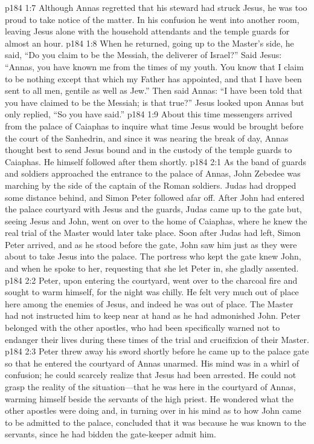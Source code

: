 \vs p184 1:7 Although Annas regretted that his steward had struck Jesus, he was too proud to take notice of the matter. In his confusion he went into another room, leaving Jesus alone with the household attendants and the temple guards for almost an hour.
\vs p184 1:8 When he returned, going up to the Master’s side, he said, “Do you claim to be the Messiah, the deliverer of Israel?” Said Jesus: \textcolor{ubdarkred}{“Annas, you have known me from the times of my youth. You know that I claim to be nothing except that which my Father has appointed, and that I have been sent to all men, gentile as well as Jew.”} Then said Annas: “I have been told that you have claimed to be the Messiah; is that true?” Jesus looked upon Annas but only replied, \textcolor{ubdarkred}{“So you have said.”}
\vs p184 1:9 About this time messengers arrived from the palace of Caiaphas to inquire what time Jesus would be brought before the court of the Sanhedrin, and since it was nearing the break of day, Annas thought best to send Jesus bound and in the custody of the temple guards to Caiaphas. He himself followed after them shortly.\plusone
{}
\vs p184 2:1 As the band of guards and soldiers approached the entrance to the palace of Annas, John Zebedee was marching by the side of the captain of the Roman soldiers. Judas had dropped some distance behind, and Simon Peter followed afar off. After John had entered the palace courtyard with Jesus and the guards, Judas came up to the gate but, seeing Jesus and John, went on over to the home of Caiaphas, where he knew the real trial of the Master would later take place. Soon after Judas had left, Simon Peter arrived, and as he stood before the gate, John saw him just as they were about to take Jesus into the palace. The portress who kept the gate knew John, and when he spoke to her, requesting that she let Peter in, she gladly assented.
\vs p184 2:2 Peter, upon entering the courtyard, went over to the charcoal fire and sought to warm himself, for the night was chilly. He felt very much out of place here among the enemies of Jesus, and indeed he was out of place. The Master had not instructed him to keep near at hand as he had admonished John. Peter belonged with the other apostles, who had been specifically warned not to endanger their lives during these times of the trial and crucifixion of their Master.
\vs p184 2:3 Peter threw away his sword shortly before he came up to the palace gate so that he entered the courtyard of Annas unarmed. His mind was in a whirl of confusion; he could scarcely realize that Jesus had been arrested. He could not grasp the reality of the situation---that he was here in the courtyard of Annas, warming himself beside the servants of the high priest. He wondered what the other apostles were doing and, in turning over in his mind as to how John came to be admitted to the palace, concluded that it was because he was known to the servants, since he had bidden the gate\hyp{}keeper admit him.
